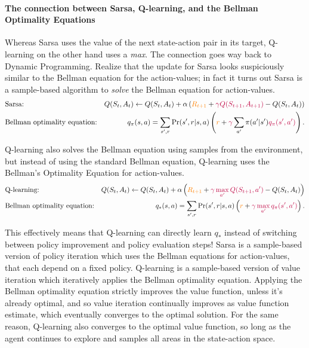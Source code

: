 \documentclass[12pt]{article}
\begin{document}
\paragraph{The connection between Sarsa, Q-learning, and the Bellman Optimality Equations}
Whereas Sarsa uses the value of the next state-action pair in its target, Q-learning on the other hand uses a \emph{max}. The connection goes way back to Dynamic Programming. Realize that the update for Sarsa looks suspiciously similar to the Bellman equation for the action-values; in fact it turns out Sarsa is a sample-based algorithm to \emph{solve} the Bellman equation for action-values.
\begin{align*}
  &\textrm{Sarsa:} \hspace{20pt} &Q(S_t, A_t) \gets Q(S_t, A_t) + \alpha   \left({\color{orange}R_{t+1}} + {\color{purple} \gamma Q(S_{t+1}, A_{t+1})} - Q(S_t, A_t)\right) \\
  &\textrm{Bellman optimality equation:} &q_\pi(s,a) = \sum_{s',r} \Pr(s', r | s, a) \left( {\color{orange} r} + {\color{purple}\gamma} \sum_{a'} \pi(a'|s') {\color{purple} q_\pi(s',a')}\right).
\end{align*}

Q-learning also solves the Bellman equation using samples from the environment, but instead of using the standard Bellman equation, Q-learning uses the Bellman's Optimality Equation for action-values.
\begin{align*}
  &\textrm{Q-learning:} \hspace{20pt} &Q(S_t, A_t) \gets Q(S_t, A_t) + \alpha   \left({\color{orange}R_{t+1}} + {\color{purple} \gamma \max_{a'} Q(S_{t+1}, a')} - Q(S_t, A_t)\right) \\
  &\textrm{Bellman optimality equation:} &q_*(s,a) = \sum_{s',r} \Pr(s', r | s, a) \left( {\color{orange} r} + {\color{purple}\gamma \max_{a'} q_\pi(s',a')}\right).
\end{align*}

This effectively means that Q-learning can directly learn $q_*$ instead of switching between policy improvement and policy evaluation steps! Sarsa is a sample-based version of policy iteration which uses the Bellman equations for action-values, that each depend on a fixed policy. Q-learning is a sample-based version of value iteration which iteratively applies the Bellman optimality equation. Applying the Bellman optimality equation strictly improves the value function, unless it's already optimal, and so value iteration continually improves as value function estimate, which eventually converges to the optimal solution.  For the same reason, Q-learning also converges to the optimal value function, so long as the agent continues to explore and samples all areas in the state-action space.
\end{document}
